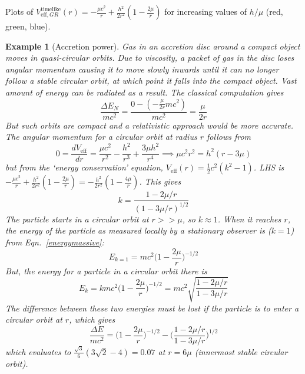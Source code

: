 \documentclass[a4paper]{article}
\newtheorem{eg}{Example}[section]
\theoremstyle{new}
\begin{document}
\newpage
\begin{center}
\end{center}
Plots of $V_{\text{eff},GR}^{\text{timelike}}(r)=-\frac{\mu c^2}{r}+\frac{h^2}{2r^2}(1-\frac{2\mu}{r})$ for increasing values of $h/\mu$ (red, green, blue).
\begin{eg}[Accretion power]
Gas in an accretion disc around a compact object moves in quasi-circular orbits. Due to viscosity, a packet of gas in the disc loses angular momentum causing it to move slowly inwards until it can no longer follow a stable circular orbit, at which point it falls into the compact object. Vast amount of energy can be radiated as a result. The classical computation gives
$$\frac{\Delta E_N}{mc^2}=\frac{0-(-\frac{\mu}{2r}mc^2)}{mc^2}=\frac{\mu}{2r}$$
But such orbits are compact and a relativistic approach would be more accurate. The angular momentum for a circular orbit at radius $r$ follows from
$$0=\frac{dV_{\text{eff}}}{dr}=\frac{\mu c^2}{r^2}-\frac{h^2}{r^3}+\frac{3\mu h^2}{r^4}\implies\mu c^2r^2=h^2(r-3\mu)$$
but from the `energy conservation' equation, $V_{\text{eff}}(r)=\frac{1}{2}c^2(k^2-1)$. LHS is $-\frac{\mu c^2}{r}+\frac{h^2}{2r^2}(1-\frac{2\mu}{r})=-\frac{h^2}{2r^2}(1-\frac{4\mu}{r})$. This gives 
$$k=\frac{1-2\mu/r}{(1-3\mu/r)^{1/2}}$$
The particle starts in a circular orbit at $r>>\mu$, so $k\approx 1$. When it reaches $r$, the energy of the particle as measured locally by a stationary observer is ($k=1$) from Eqn.~\ref{energymassive}:
$$E_{k=1}=mc^2\bigg(1-\frac{2\mu}{r}\bigg)^{-1/2}$$
But, the energy for a particle in a circular orbit there is
$$E_{k}=kmc^2\bigg(1-\frac{2\mu}{r}\bigg)^{-1/2}=mc^2\sqrt{\frac{1-2\mu/r}{1-3\mu/r}}$$
The difference between these two energies must be lost if the particle is to enter a circular orbit at $r$, which gives
$$\frac{\Delta E}{mc^2}=\bigg(1-\frac{2\mu}{r}\bigg)^{-1/2}-\bigg(\frac{1-2\mu/r}{1-3\mu/r}\bigg)^{1/2}$$
which evaluates to $\frac{\sqrt{3}}{6}(3\sqrt{2}-4)=0.07$ at $r=6\mu$ (innermost stable circular orbit).
\end{eg}
\end{document}
